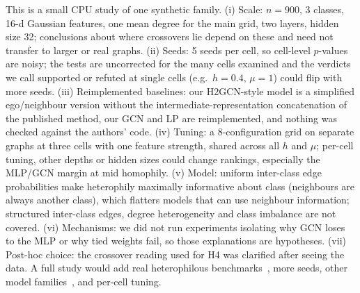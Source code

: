 This is a small CPU study of one synthetic family. (i) Scale: $n=900$, 3 classes, 16-d Gaussian features, one mean degree for the main grid, two layers, hidden size 32; conclusions about where crossovers lie depend on these and need not transfer to larger or real graphs. (ii) Seeds: 5 seeds per cell, so cell-level $p$-values are noisy; the tests are uncorrected for the many cells examined and the verdicts we call supported or refuted at single cells (e.g.\ $h=0.4$, $\mu=1$) could flip with more seeds. (iii) Reimplemented baselines: our H2GCN-style model is a simplified ego/neighbour version without the intermediate-representation concatenation of the published method, our GCN and LP are reimplemented, and nothing was checked against the authors' code. (iv) Tuning: a 8-configuration grid on separate graphs at three cells with one feature strength, shared across all $h$ and $\mu$; per-cell tuning, other depths or hidden sizes could change rankings, especially the MLP/GCN margin at mid homophily. (v) Model: uniform inter-class edge probabilities make heterophily maximally informative about class (neighbours are always another class), which flatters models that can use neighbour information; structured inter-class edges, degree heterogeneity and class imbalance are not covered. (vi) Mechanisms: we did not run experiments isolating why GCN loses to the MLP or why tied weights fail, so those explanations are hypotheses. (vii) Post-hoc choice: the crossover reading used for H4 was clarified after seeing the data. A full study would add real heterophilous benchmarks~\cite{platonov2023critical}, more seeds, other model families~\cite{chien2020adaptive,lim2021large}, and per-cell tuning.
